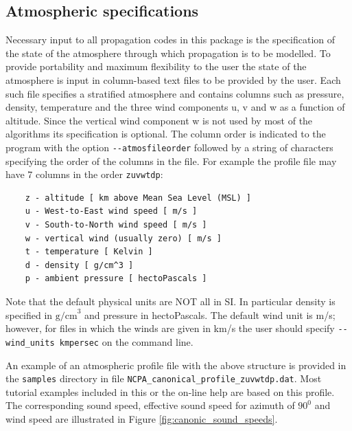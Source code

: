 \subsection{Atmospheric specifications}
\label{sec: AtmoSpecs}
Necessary input to all propagation codes in this package is the specification of the state of the atmosphere through which propagation is to be modelled. To provide portability and maximum flexibility to the user the state of the atmosphere is input in column-based text files to be provided by the user. Each such file specifies a stratified atmosphere and contains columns such as pressure, density, temperature and the three wind components u, v and w as a function of altitude. Since the vertical wind component w is not used by most of the algorithms its specification is optional. The column order is indicated to the program with the option \verb"--atmosfileorder" followed by a string of characters specifying the order of the columns in the file. For example the profile file may have 7 columns in the order \verb"zuvwtdp":  
\begin{verbatim}
    z - altitude [ km above Mean Sea Level (MSL) ]
    u - West-to-East wind speed [ m/s ]
    v - South-to-North wind speed [ m/s ]
    w - vertical wind (usually zero) [ m/s ]
    t - temperature [ Kelvin ]
    d - density [ g/cm^3 ]
    p - ambient pressure [ hectoPascals ]
\end{verbatim}
Note that the default physical units are NOT all in SI. In particular density is specified in $\text{g/cm}^3$ and pressure in hectoPascals. The default wind unit is m/s; however, for files in which the winds are given in km/s the user should specify  \verb"--wind_units kmpersec" on the command line.

An example of an atmospheric profile file with the above structure is provided in the \verb"samples" directory in file \verb"NCPA_canonical_profile_zuvwtdp.dat". Most tutorial examples included in this or the on-line help are based on this profile. The corresponding sound speed, effective sound speed for azimuth of $90^0$ and wind speed are illustrated in Figure \ref{fig:canonic_sound_speeds}.

